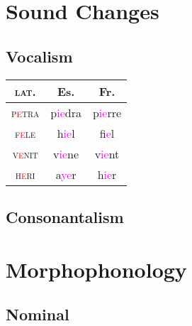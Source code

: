 \documentclass{report}
\begin{document}
\section{Sound Changes}

\subsection{Vocalism}

\begin{tcolorbox}[title=Diphthongization]
  
\end{tcolorbox}

\begin{tabular}{c c c}
  \textsc{lat.} & Es. & Fr. \\
  \hline
  \textsc{p\textcolor{red}{e}tra} & p\textcolor{magenta}{ie}dra & p\textcolor{magenta}{ie}rre \\
  \textsc{f\textcolor{red}{e}le} & h\textcolor{magenta}{ie}l & f\textcolor{magenta}{ie}l \\
  \textsc{v\textcolor{red}{e}nit} & v\textcolor{magenta}{ie}ne & v\textcolor{magenta}{ie}nt \\
  \textsc{h\textcolor{red}{e}ri} & a\textcolor{magenta}{ye}r & h\textcolor{magenta}{ie}r \\
\end{tabular}

\subsection{Consonantalism}

\begin{tcolorbox}[title=Degemination]
  
\end{tcolorbox}

\begin{tcolorbox}[title=Palatalization of Dentals]

\end{tcolorbox}

\begin{tcolorbox}[title=Lenition I]

\end{tcolorbox}

\section{Morphophonology}

\subsection{Nominal}
\end{document}
